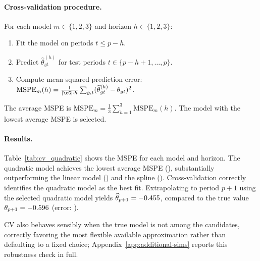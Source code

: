 \paragraph{Cross-validation procedure.}
For each model $m \in \{1, 2, 3\}$ and horizon $h \in \{1, 2, 3\}$:
\begin{enumerate}
    \item Fit the model on periods $t \leq p - h$.
    \item Predict $\widehat{\theta}_{gt}^{(h)}$ for test periods $t \in \{p - h + 1, \ldots, p\}$.
    \item Compute mean squared prediction error: $\text{MSPE}_m(h) = \frac{1}{|\cG| \cdot h} \sum_{g, t} (\widehat{\theta}_{gt}^{(h)} - \theta_{gt})^2$.
\end{enumerate}
The average MSPE is $\text{MSPE}_m = \frac{1}{3} \sum_{h=1}^3 \text{MSPE}_m(h)$. The model with the lowest average MSPE is selected.

\paragraph{Results.}
Table~\ref{tab:cv_quadratic} shows the MSPE for each model and horizon. The quadratic model achieves the lowest average MSPE (\cvQuadBestMSPE), substantially outperforming the linear model (\cvQuadLinearMSPE) and the spline (\cvQuadSplineMSPE). Cross-validation correctly identifies the quadratic model as the best fit. Extrapolating to period $p + 1$ using the selected quadratic model yields $\widehat{\theta}_{p+1} = -0.455$, compared to the true value $\theta_{p+1} = -0.596$ (error: \cvQuadFATTError).



CV also behaves sensibly when the true model is not among the candidates, correctly favoring the most flexible available approximation rather than defaulting to a fixed choice; Appendix~\ref{app:additional-sims} reports this robustness check in full.
